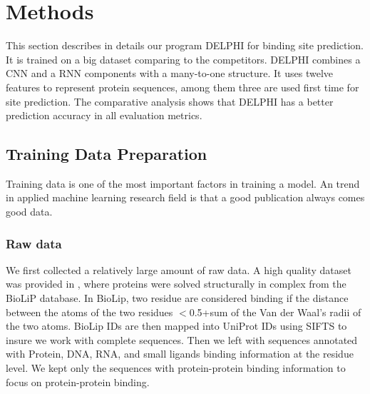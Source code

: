 \section{Methods}
This section describes in details our program DELPHI for binding site prediction. It is trained on a big dataset comparing to the competitors. DELPHI combines a CNN and a RNN components with a many-to-one structure. It uses twelve features to represent protein sequences, among them three are used first time for site prediction. The comparative analysis shows that DELPHI has a better prediction accuracy in all evaluation metrics. 

\subsection{Training Data Preparation}
Training data is one of the most important factors in training a model. An trend in applied machine learning research field is that a good publication always comes good data. 
    
\subsubsection{Raw data}
We first collected a relatively large amount of raw data. A high quality dataset was provided in \cite{zhang2019comprehensive}, where proteins were solved structurally in complex from the BioLiP \cite{yang2012biolip} database. In BioLip, two residue are considered binding if the distance between the atoms of the 
two residues $<$0.5+sum of the Van der Waal's radii of the two atoms. BioLip IDs are then mapped into UniProt IDs using SIFTS \cite{velankar2012sifts} to insure we work with complete sequences. Then we left with sequences annotated with Protein, DNA, RNA, and small ligands binding information at the residue level. We kept only the sequences with protein-protein binding information to focus on protein-protein binding.
